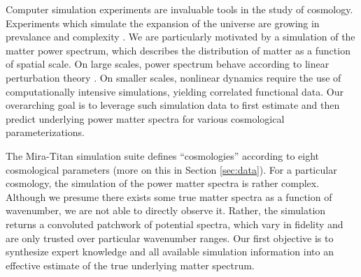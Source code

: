 \documentclass[11pt]{article}
\begin{document}
Computer simulation experiments are invaluable tools in the study of cosmology.
Experiments which simulate the expansion of the universe are growing
in prevalance and complexity \citep[e.g.,][]{lawrence2010coyote,derose2019aemulus,
nishimichi2019dark,angulo2021bacco,euclid2021euclid,moran2023mira}.  
We are particularly motivated by a simulation
of the matter power spectrum, which describes the distribution of matter as a 
function of spatial scale. 
On large scales, power spectrum behave according to linear perturbation 
theory \citep{pietroni2008flowing, lesgourgues2009non}.  On smaller scales, nonlinear 
dynamics require the use of computationally intensive simulations, yielding
correlated functional data.
Our overarching goal is to leverage such simulation data to 
first estimate and then predict underlying power matter spectra for various 
cosmological parameterizations.

The Mira-Titan simulation suite \citep{moran2023mira}
defines ``cosmologies'' according to eight cosmological parameters (more on this
in Section \ref{sec:data}).  For a particular cosmology, the simulation of the power matter spectra 
is rather complex.  Although we presume there exists some true matter spectra as a function
of wavenumber, we are not able to directly observe it.  Rather, the simulation returns
a convoluted patchwork of potential spectra, which vary in fidelity and are only trusted
over particular wavenumber ranges.  Our first objective is to synthesize expert knowledge
and all available simulation information into an effective estimate of the true underlying
matter spectrum.  
\end{document}
